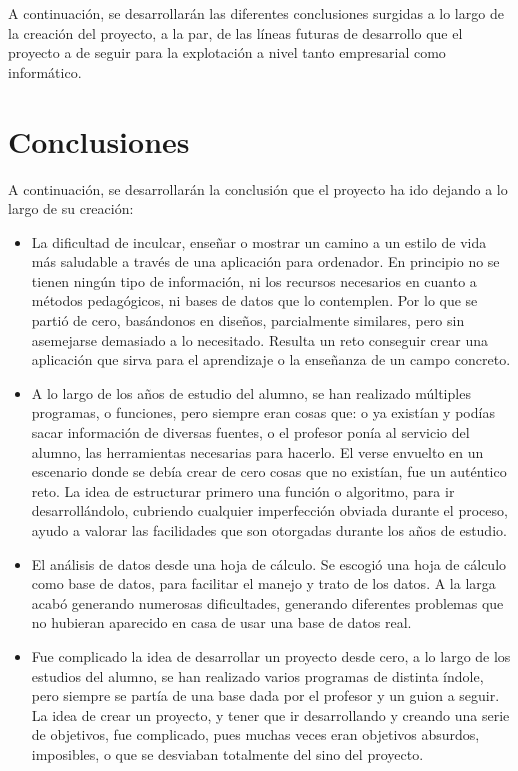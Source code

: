 
A continuación, se desarrollarán las diferentes conclusiones surgidas a lo largo de la creación del proyecto, a la par, de las líneas futuras de desarrollo que el proyecto a de seguir para la explotación a nivel tanto empresarial como informático.
\\
\section{Conclusiones}
A continuación, se desarrollarán la conclusión que el proyecto ha ido dejando a lo largo de su creación:
\begin{itemize}
\item	La dificultad de inculcar, enseñar o mostrar un camino a un estilo de vida más saludable a través de una aplicación para ordenador. En principio no se tienen ningún tipo de información, ni los recursos necesarios en cuanto a métodos pedagógicos, ni bases de datos que lo contemplen. Por lo que se partió de cero, basándonos en diseños, parcialmente similares, pero sin asemejarse demasiado a lo necesitado. Resulta un reto conseguir crear una aplicación que sirva para el aprendizaje o la enseñanza de un campo concreto.
\item	A lo largo de los años de estudio del alumno, se han realizado múltiples programas, o funciones, pero siempre eran cosas que: o ya existían y podías sacar información de diversas fuentes, o el profesor ponía al servicio del alumno, las herramientas necesarias para hacerlo. El verse envuelto en un escenario donde se debía crear de cero cosas que no existían, fue un auténtico reto. La idea de estructurar primero una función o algoritmo, para ir desarrollándolo, cubriendo cualquier imperfección obviada durante el proceso, ayudo a valorar las facilidades que son otorgadas durante los años de estudio.
\item	El análisis de datos desde una hoja de cálculo. Se escogió una hoja de cálculo como base de datos, para facilitar el manejo y trato de los datos. A la larga acabó generando numerosas dificultades, generando diferentes problemas que no hubieran aparecido en casa de usar una base de datos real.
\item	Fue complicado la idea de desarrollar un proyecto desde cero, a lo largo de los estudios del alumno, se han realizado varios programas de distinta índole, pero siempre se partía de una base dada por el profesor y un guion a seguir. La idea de crear un proyecto, y tener que ir desarrollando y creando una serie de objetivos, fue complicado, pues muchas veces eran objetivos absurdos, imposibles, o que se desviaban totalmente del sino del proyecto.

\end{itemize}
